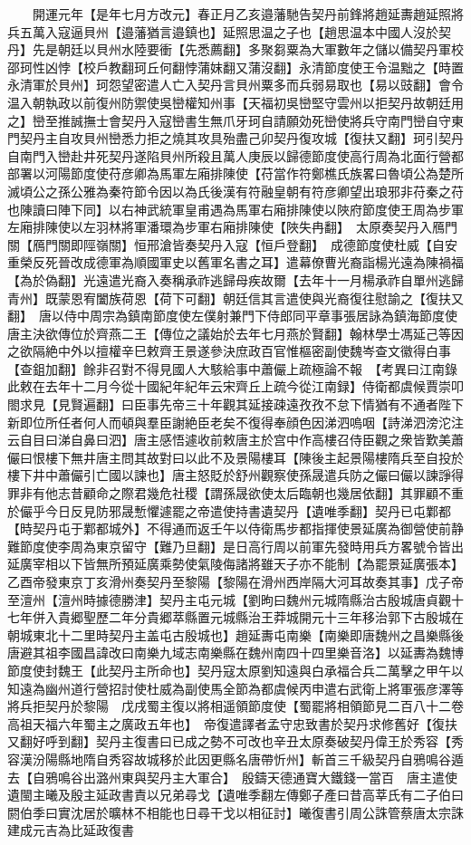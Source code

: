 　　開運元年【是年七月方改元】春正月乙亥邉藩馳告契丹前鋒將趙延夀趙延照將兵五萬入寇逼貝州【邉藩猶言邉鎮也】延照思温之子也【趙思温本中國人沒於契丹】先是朝廷以貝州水陸要衝【先悉薦翻】多聚芻粟為大軍數年之儲以備契丹軍校邵珂性凶悖【校戶教翻珂丘何翻悖蒲妺翻又蒲沒翻】永清節度使王令温黜之【時置永清軍於貝州】珂怨望密遣人亡入契丹言貝州粟多而兵弱易取也【易以豉翻】會令温入朝執政以前復州防禦使吳巒權知州事【天福初吳巒堅守雲州以拒契丹故朝廷用之】巒至推誠撫士會契丹入寇巒書生無爪牙珂自請願効死巒使將兵守南門巒自守東門契丹主自攻貝州巒悉力拒之燒其攻具殆盡己卯契丹復攻城【復扶又翻】珂引契丹自南門入巒赴井死契丹遂陷貝州所殺且萬人庚辰以歸德節度使高行周為北面行營都部署以河陽節度使苻彦卿為馬軍左廂排陳使【苻當作符鄭樵氏族畧曰魯頃公為楚所滅頃公之孫公雅為秦符節令因以為氏後漢有符融皇朝有符彦卿望出琅邪非苻秦之苻也陳讀曰陣下同】以右神武統軍皇甫遇為馬軍右廂排陳使以陜府節度使王周為步軍左廂排陳使以左羽林將軍潘環為步軍右廂排陳使【陜失冉翻】　太原奏契丹入鴈門關【鴈門關即陘嶺關】恒邢滄皆奏契丹入寇【恒戶登翻】　成德節度使杜威【自安重榮反死晉改成德軍為順國軍史以舊軍名書之耳】遣幕僚曹光裔詣楊光遠為陳禍福【為於偽翻】光遠遣光裔入奏稱承祚逃歸母疾故爾【去年十一月楊承祚自單州逃歸青州】既蒙恩宥闔族荷恩【荷下可翻】朝廷信其言遣使與光裔復往慰諭之【復扶又翻】　唐以侍中周宗為鎮南節度使左僕射兼門下侍郎同平章事張居詠為鎮海節度使　唐主決欲傳位於齊燕二王【傳位之議始於去年七月燕於賢翻】翰林學士馮延己等因之欲隔絶中外以擅權辛巳敕齊王景遂參決庶政百官惟樞密副使魏岑查文徽得白事【查鉏加翻】餘非召對不得見國人大駭給事中蕭儼上疏極論不報　【考異曰江南錄此敕在去年十二月今從十國紀年紀年云宋齊丘上疏今從江南録】侍衛都虞候賈崇叩閤求見【見賢遍翻】曰臣事先帝三十年觀其延接疎遠孜孜不怠下情猶有不通者陛下新即位所任者何人而頓與羣臣謝絶臣老矣不復得奉顔色因涕泗嗚咽【詩涕泗滂沱注云自目曰涕自鼻曰泗】唐主感悟遽收前敕唐主於宫中作高樓召侍臣觀之衆皆歎美蕭儼曰恨樓下無井唐主問其故對曰以此不及景陽樓耳【陳後主起景陽樓隋兵至自投於樓下井中蕭儼引亡國以諫也】唐主怒貶於舒州觀察使孫晟遣兵防之儼曰儼以諫諍得罪非有他志昔顧命之際君幾危社稷【謂孫晟欲使太后臨朝也幾居依翻】其罪顧不重於儼乎今日反見防邪晟慙懼遽罷之帝遣使持書遺契丹【遺唯季翻】契丹已屯鄴都【時契丹屯于鄴都城外】不得通而返壬午以侍衛馬步都指揮使景延廣為御營使前静難節度使李周為東京留守【難乃旦翻】是日高行周以前軍先發時用兵方畧號令皆出延廣宰相以下皆無所預延廣乘勢使氣陵侮諸將雖天子亦不能制【為罷景延廣張本】乙酉帝發東京丁亥滑州奏契丹至黎陽【黎陽在滑州西岸隔大河耳故奏其事】戊子帝至澶州【澶州時據德勝津】契丹主屯元城【劉昫曰魏州元城隋縣治古殷城唐貞觀十七年併入貴郷聖歷二年分貴郷萃縣置元城縣治王莽城開元十三年移治郭下古殷城在朝城東北十二里時契丹主盖屯古殷城也】趙延夀屯南樂【南樂即唐魏州之昌樂縣後唐避其祖李國昌諱改曰南樂九域志南樂縣在魏州南四十四里樂音洛】以延夀為魏博節度使封魏王【此契丹主所命也】契丹寇太原劉知遠與白承福合兵二萬擊之甲午以知遠為幽州道行營招討使杜威為副使馬全節為都虞候丙申遣右武衛上將軍張彦澤等將兵拒契丹於黎陽　戊戌蜀主復以將相遥領節度使【蜀罷將相領節見二百八十二卷高祖天福六年蜀主之廣政五年也】　帝復遣譯者孟守忠致書於契丹求修舊好【復扶又翻好呼到翻】契丹主復書曰已成之勢不可改也辛丑太原奏破契丹偉王於秀容【秀容漢汾陽縣地隋自秀容故城移於此因更縣名唐帶忻州】斬首三千級契丹自鴉鳴谷遁去【自鴉鳴谷出潞州東與契丹主大軍合】　殷鑄天德通寶大鐵錢一當百　唐主遣使遺閩主曦及殷主延政書責以兄弟尋戈【遺唯季翻左傳鄭子產曰昔高莘氏有二子伯曰閼伯季曰實沈居於曠林不相能也日尋干戈以相征討】曦復書引周公誅管蔡唐太宗誅建成元吉為比延政復書